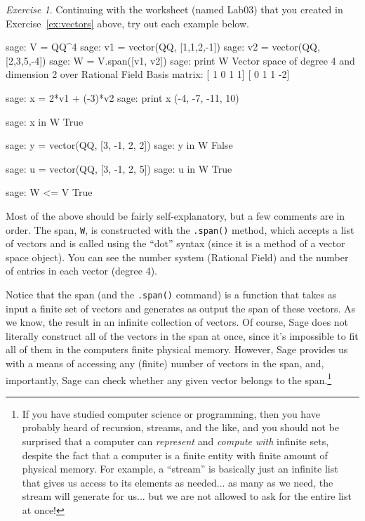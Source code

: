 \documentclass[fleqn,11pt]{paper}
\theoremstyle{remark}
\newtheorem{exercise}{Exercise}
\newcommand{\<}{\ensuremath{\langle}}
\renewcommand{\>}{\ensuremath{\rangle}}
\begin{document}
\begin{exercise}
  Continuing with the worksheet (named Lab03) that you created in
  Exercise~\ref{ex:vectors} above, try out each example below. 
\end{exercise}
\begin{sageblock}
    sage: V = QQ^4
    sage: v1 = vector(QQ, [1,1,2,-1])
    sage: v2 = vector(QQ, [2,3,5,-4])
    sage: W = V.span([v1, v2])
    sage: print W
      Vector space of degree 4 and dimension 2 over Rational Field
      Basis matrix:
      [ 1 0 1 1]
      [ 0 1 1 -2]

    sage: x = 2*v1 + (-3)*v2
    sage: print x
      (-4, -7, -11, 10)

    sage: x in W
      True

    sage: y = vector(QQ, [3, -1, 2, 2])
    sage: y in W
      False

    sage: u = vector(QQ, [3, -1, 2, 5])
    sage: u in W
      True

    sage: W <= V
      True
\end{sageblock}
Most of the above should be fairly self-explanatory, but a few comments are in
order. The span, {\tt W}, is constructed with the {\tt .span()} method,
which accepts a list of vectors and is called using the ``dot'' syntax (since it
is a method of a vector space object).
You can see the number system (Rational Field) and the number
of entries in each vector (degree 4). 

Notice that the span (and the {\tt .span()} command) is a
function that takes as input a finite set of vectors and generates as output the
span of these vectors. As we know, the result in an infinite collection of vectors.
Of course, Sage does not literally construct all of the vectors in the span at once,
since it's impossible to fit all of them in the computers finite physical memory.  However,
Sage provides us with a means of accessing any (finite) number of vectors in the
span, and, importantly, Sage can check whether any given vector belongs to the span.\footnote{If
  you have studied computer 
  science or programming, then you have probably heard of recursion, streams, and the like,
  and you should not be surprised that a computer can \emph{represent} and
  \emph{compute with} infinite sets, despite the fact that
  a computer is a finite entity with finite amount of physical
  memory. For example, a ``stream'' is basically just an infinite list
  that gives us access to its elements as needed... as many as we need, the
  stream will generate for us... but we are not allowed to ask for the entire list at once!}
\end{document}
